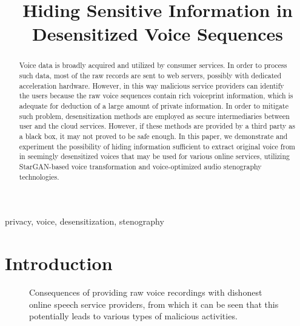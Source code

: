 \documentclass[journal]{IEEEtran} %
\begin{document}
\title{Hiding Sensitive Information in Desensitized Voice Sequences}

\maketitle

\begin{abstract}
Voice data is broadly acquired and utilized by consumer services. In order to process such data, most of the raw records are sent to web servers, possibly with dedicated acceleration hardware. However, in this way malicious service providers can identify the users because the raw voice sequences contain rich voiceprint information, which is adequate for deduction of a large amount of private information. In order to mitigate such problem, desensitization methods are employed as secure intermediaries between user and the cloud services. However, if these methods are provided by a third party as a black box, it may not proved to be safe enough. In this paper, we demonstrate and experiment the possibility of hiding information sufficient to extract original voice from in seemingly desensitized voices that may be used for various online services, utilizing StarGAN-based voice transformation and voice-optimized audio stenography technologies.
\end{abstract}

\begin{IEEEkeywords}
    privacy, voice, desensitization, stenography
\end{IEEEkeywords}

\section{Introduction}
\label{seg:intro}

\begin{figure}[!t]
    \caption{Consequences of providing raw voice recordings with dishonest online speech service providers, from which it can be seen that this potentially leads to various types of malicious activities.}
    \label{fig:dishonest_provider}
\end{figure}
\end{document}
